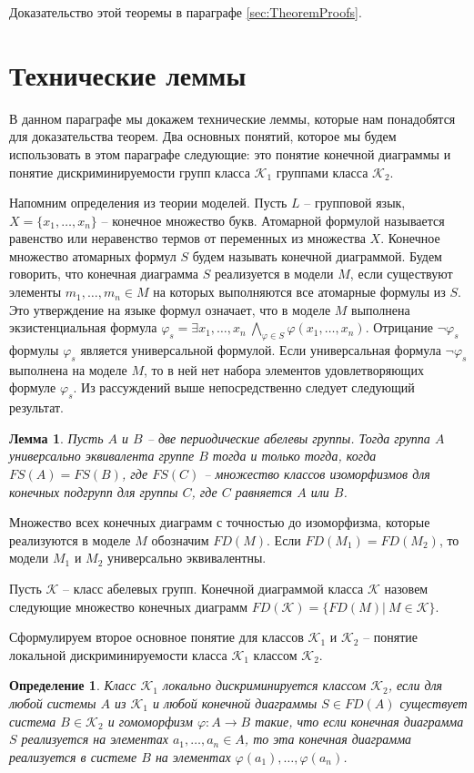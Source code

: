 \documentclass[a4paper,11pt,twoside]{article}
\newtheorem{lemma}{Лемма}[section]
\newtheorem{definition}{Определение}[section]
\def\K{{\mathcal{K}}}
\begin{document}
Доказательство этой теоремы в параграфе \ref{sec:TheoremProofs}.


\section{Технические леммы}\label{Sec:lemmas}

В данном параграфе мы докажем технические леммы, которые нам понадобятся для доказательства теорем. Два основных понятий, которое мы будем использовать в этом параграфе следующие: это понятие конечной диаграммы и понятие дискриминируемости групп класса $\K_1$ группами класса $\K_2$.

Напомним определения из теории моделей. Пусть $L$ -- групповой язык, $X = \{x_1, \ldots, x_n\}$ -- конечное множество букв. Атомарной формулой называется равенство или неравенство термов от переменных из множества $X$. Конечное множество атомарных формул $S$ будем называть конечной диаграммой. Будем говорить, что конечная диаграмма $S$ реализуется в модели $M$, если существуют элементы $m_1, \ldots, m_n \in M$ на которых выполняются все атомарные формулы из $S$. Это утверждение на языке формул означает, что в моделе $M$ выполнена экзистенциальная формула $\varphi_s = \exists x_1, \ldots, x_n \ \bigwedge\limits_{\varphi \in S} \varphi(x_1, \ldots, x_n)$. Отрицание $\neg\varphi_s$ формулы $\varphi_s$ является универсальной формулой. Если универсальная формула $\neg\varphi_s$ выполнена на моделе $M$, то в ней нет набора элементов удовлетворяющих формуле $\varphi_s$. Из рассуждений выше непосредственно следует следующий результат.

\begin{lemma}
Пусть $A$ и $B$ -- две периодические абелевы группы. Тогда группа $A$ универсально эквивалента группе $B$ тогда и только тогда, когда $FS(A) = FS(B)$, где $FS(C)$ -- множество классов изоморфизмов для конечных подгрупп для группы $C$, где $C$ равняется $A$ или $B$.
\end{lemma}


 Множество всех конечных диаграмм с точностью до изоморфизма, которые реализуются в моделе $M$ обозначим $FD(M)$. Если $FD(M_1) = FD(M_2)$, то модели $M_1$ и $M_2$ универсально эквивалентны.

Пусть $\K$ -- класс абелевых групп. Конечной диаграммой класса $\K$ назовем следующие множество конечных диаграмм $FD(\K) = \{FD(M) | \ M \in \K\}$. 

Сформулируем второе основное понятие для классов $\K_1$ и $\K_2$ -- понятие локальной дискриминируемости класса $\K_1$ классом $\K_2$.
\begin{definition}
Класс $\K_1$ локально дискриминируется классом $\K_2$, если для любой системы $A$ из $\K_1$ и любой конечной диаграммы $S \in FD(A)$ существует система $B \in \K_2$ и гомоморфизм $\varphi: A \rightarrow B$ такие, что если конечная диаграмма $S$ реализуется на элементах $a_1, \ldots, a_n \in A$, то эта конечная диаграмма реализуется в системе $B$ на элементах $\varphi(a_1), \ldots, \varphi(a_n)$.
\end{definition}
\end{document}
